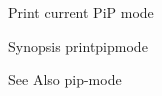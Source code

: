 Print current Pi\-P mode

\begin{DoxyParagraph}{Synopsis}
printpipmode
\end{DoxyParagraph}
\begin{DoxySeeAlso}{See Also}
pip-\/mode 
\end{DoxySeeAlso}
